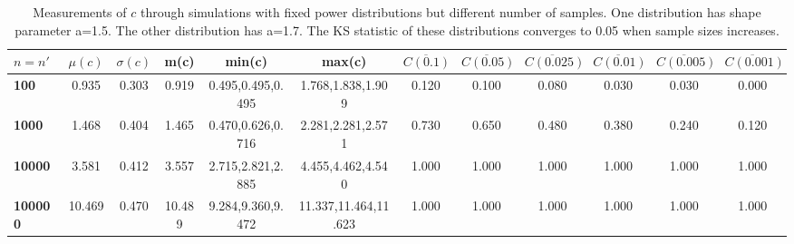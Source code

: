 \begin{table*}[h!]
\vspace{-.3cm}
\begin{center}
\begin{tabular}{| l | c | c | c | c | c | c | c | c | c | c | c |}\hline
$n=n'$ & $\mu(c)$ & $\sigma(c)$ & m(c) & min(c) & max(c) & $\overline{C(0.1)}$ & $\overline{C(0.05)}$ & $\overline{C(0.025)}$ & $\overline{C(0.01)}$ & $\overline{C(0.005)}$ & $\overline{C(0.001)}$ \\\hline\hline
{\bf 100} & 0.935 & 0.303 & 0.919 & 0.495,0.495,0.495 & 1.768,1.838,1.909 & 0.120 & 0.100 & 0.080 & 0.030 & 0.030 & 0.000 \\\hline
{\bf 1000} & 1.468 & 0.404 & 1.465 & 0.470,0.626,0.716 & 2.281,2.281,2.571 & 0.730 & 0.650 & 0.480 & 0.380 & 0.240 & 0.120 \\\hline
{\bf 10000} & 3.581 & 0.412 & 3.557 & 2.715,2.821,2.885 & 4.455,4.462,4.540 & 1.000 & 1.000 & 1.000 & 1.000 & 1.000 & 1.000 \\\hline
{\bf 100000} & 10.469 & 0.470 & 10.489 & 9.284,9.360,9.472 & 11.337,11.464,11.623 & 1.000 & 1.000 & 1.000 & 1.000 & 1.000 & 1.000 \\\hline
\end{tabular}
\caption{Measurements of $c$ through simulations
        with fixed power distributions but different number of samples.
        One distribution has shape parameter a=1.5.
        The other distribution has a=1.7.
        The KS statistic of these distributions converges
        to 0.05 when sample sizes increases.}
\end{center}
\end{table*}